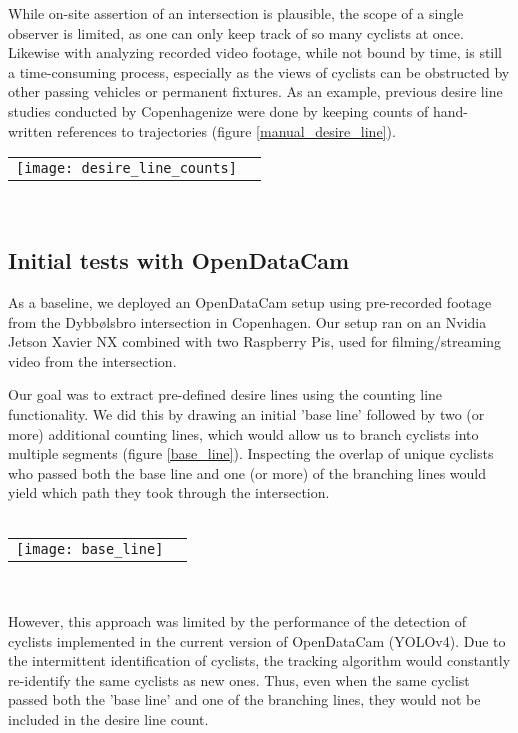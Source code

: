 While on-site assertion of an intersection is plausible, the scope of a single observer is limited, as one can only keep track of 
so many cyclists at once. Likewise with analyzing recorded video footage, while not bound by time, is still a time-consuming process, 
especially as the views of cyclists can be obstructed by other passing vehicles or permanent fixtures. 
As an example, previous desire line studies conducted by Copenhagenize were done by keeping counts of hand-written references to trajectories (figure \ref{manual_desire_line}).
\ \\

\raggedbottom
\noindent
\begin{tabular}{@{}cc}
\texttt{[image: desire\_line\_counts]} 
\end{tabular}
\label{manual_desire_line}
\

\subsection{Initial tests with OpenDataCam}
As a baseline, we deployed an OpenDataCam setup using pre-recorded footage from the Dybbølsbro intersection in Copenhagen.
Our setup ran on an Nvidia Jetson Xavier NX combined with two Raspberry Pis, used for filming/streaming video from the intersection.

Our goal was to extract pre-defined desire lines using the counting line functionality. We did this by drawing an initial 
'base line' followed by two (or more) additional counting lines, which would allow us to branch cyclists into multiple segments (figure \ref{base_line}). Inspecting the
overlap of unique cyclists who passed both the base line and one (or more) of the branching lines would yield which path
they took through the intersection. 
\ \\

\ \\
\raggedbottom
\noindent
\begin{tabular}{@{}cc}
\texttt{[image: base\_line]} 
\end{tabular}
\label{base_line}
\

However, this approach was limited by the performance of the detection of cyclists implemented in the current 
version of OpenDataCam (YOLOv4). Due to the intermittent identification of cyclists, the tracking algorithm would constantly 
re-identify the same cyclists as new ones. Thus, even when the same cyclist passed both the 'base line' and one of the 
branching lines, they would not be included in the desire line count.
\ \\
 
